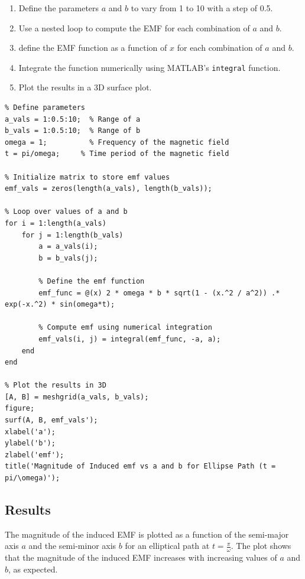 \documentclass[14pt]{article}
\newcommand*{\nsubsection}[1]{
    \subsection*{#1}
    \addcontentsline{toc}{subsection}{#1}
}
\begin{document}
\begin{enumerate}
    \item Define the parameters \(a\) and \(b\) to vary from 1 to 10 with a step of 0.5.
    \item Use a nested loop to compute the EMF for each combination of \(a\) and \(b\).
    \item define the EMF function as a function of \(x\) for each combination of \(a\) and \(b\).
    \item Integrate the function numerically using MATLAB's \texttt{integral} function.
    \item Plot the results in a 3D surface plot.
\end{enumerate}

\begin{verbatim}
% Define parameters
a_vals = 1:0.5:10;  % Range of a
b_vals = 1:0.5:10;  % Range of b
omega = 1;          % Frequency of the magnetic field
t = pi/omega;     % Time period of the magnetic field

% Initialize matrix to store emf values
emf_vals = zeros(length(a_vals), length(b_vals));

% Loop over values of a and b
for i = 1:length(a_vals)
    for j = 1:length(b_vals)
        a = a_vals(i);
        b = b_vals(j);
        
        % Define the emf function
        emf_func = @(x) 2 * omega * b * sqrt(1 - (x.^2 / a^2)) .* exp(-x.^2) * sin(omega*t);
        
        % Compute emf using numerical integration
        emf_vals(i, j) = integral(emf_func, -a, a);
    end
end

% Plot the results in 3D
[A, B] = meshgrid(a_vals, b_vals);
figure;
surf(A, B, emf_vals');
xlabel('a');
ylabel('b');
zlabel('emf');
title('Magnitude of Induced emf vs a and b for Ellipse Path (t = pi/\omega)');
\end{verbatim}

\nsubsection{Results}

The magnitude of the induced EMF is plotted as a function of the semi-major axis \(a\) and the semi-minor axis \(b\) for an elliptical path at \(t = \frac{\pi}{\omega}\). The plot shows that the magnitude of the induced EMF increases with increasing values of \(a\) and \(b\), as expected.
\end{document}
